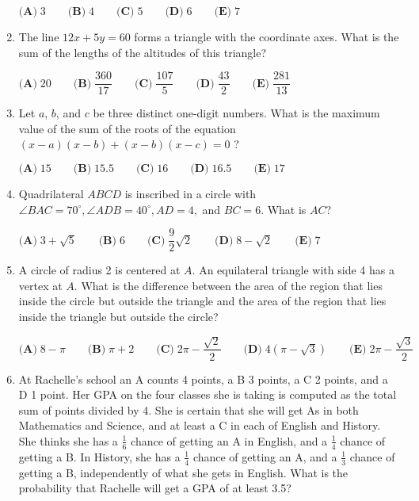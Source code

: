 \documentclass{article}
\begin{document}
\begin{enumerate}[label=\arabic*., itemsep=0.5em]
$\textbf{(A)}\; 3 \qquad\textbf{(B)}\; 4 \qquad\textbf{(C)}\; 5 \qquad\textbf{(D)}\; 6 \qquad\textbf{(E)}\; 7$\par \vspace{0.5em}\item The line $12x+5y=60$ forms a triangle with the coordinate axes. What is the sum of the lengths of the altitudes of this triangle?

$\textbf{(A)}\; 20 \qquad\textbf{(B)}\; \dfrac{360}{17} \qquad\textbf{(C)}\; \dfrac{107}{5} \qquad\textbf{(D)}\; \dfrac{43}{2} \qquad\textbf{(E)}\; \dfrac{281}{13}$\par \vspace{0.5em}\item Let $a$, $b$, and $c$ be three distinct one-digit numbers. What is the maximum value of the sum of the roots of the equation $(x-a)(x-b)+(x-b)(x-c)=0$ ?

$\textbf{(A)}\; 15 \qquad\textbf{(B)}\; 15.5 \qquad\textbf{(C)}\; 16 \qquad\textbf{(D)}\; 16.5 \qquad\textbf{(E)}\; 17$\par \vspace{0.5em}\item Quadrilateral $ABCD$ is inscribed in a circle with $\angle BAC=70^{\circ}, \angle ADB=40^{\circ}, AD=4,$ and $BC=6$. What is $AC$?

$\textbf{(A)}\; 3+\sqrt{5} \qquad\textbf{(B)}\; 6 \qquad\textbf{(C)}\; \dfrac{9}{2}\sqrt{2} \qquad\textbf{(D)}\; 8-\sqrt{2} \qquad\textbf{(E)}\; 7$\par \vspace{0.5em}\item A circle of radius 2 is centered at $A$. An equilateral triangle with side 4 has a vertex at $A$. What is the difference between the area of the region that lies inside the circle but outside the triangle and the area of the region that lies inside the triangle but outside the circle?

$\textbf{(A)}\; 8-\pi \qquad\textbf{(B)}\; \pi+2 \qquad\textbf{(C)}\; 2\pi-\dfrac{\sqrt{2}}{2} \qquad\textbf{(D)}\; 4(\pi-\sqrt{3}) \qquad\textbf{(E)}\; 2\pi-\dfrac{\sqrt{3}}{2}$\par \vspace{0.5em}\item At Rachelle's school an A counts 4 points, a B 3 points, a C 2 points, and a D 1 point. Her GPA on the four classes she is taking is computed as the total sum of points divided by 4. She is certain that she will get As in both Mathematics and Science, and at least a C in each of English and History. She thinks she has a $\tfrac{1}{6}$ chance of getting an A in English, and a $\tfrac{1}{4}$ chance of getting a B. In History, she has a $\tfrac{1}{4}$ chance of getting an A, and a $\tfrac{1}{3}$ chance of getting a B, independently of what she gets in English. What is the probability that Rachelle will get a GPA of at least 3.5?


\end{enumerate}
\end{document}
